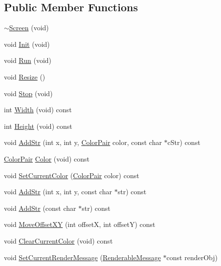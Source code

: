 \subsection*{Public Member Functions}
\begin{DoxyCompactItemize}
\item 
\hyperlink{classScreen_aca8e6d405d54bd0ea318564f11a68f00}{$\sim$\-Screen} (void)
\item 
void \hyperlink{classScreen_a383837c8034bc40ce87e96898d5be0cc}{Init} (void)
\item 
void \hyperlink{classScreen_a48842cd1df5d4117dee21a028da74a40}{Run} (void)
\item 
void \hyperlink{classScreen_a69154a73511bc8620803fa8f646ddd86}{Resize} ()
\item 
void \hyperlink{classScreen_aadce9111b1acb69bd0e6f788ae2bbd1b}{Stop} (void)
\item 
int \hyperlink{classScreen_a40b0a6eabbfe785a379388064ccea5c3}{Width} (void) const 
\item 
int \hyperlink{classScreen_abb048c10e10b8c375e64d52137a9d279}{Height} (void) const 
\item 
void \hyperlink{classScreen_a1274f1b8ed227c757d390cd764fb16d0}{Add\-Str} (int x, int y, \hyperlink{classScreen_ade5d330a53244ab5e204c9fc2a8ab235}{Color\-Pair} color, const char $\ast$c\-Str) const 
\item 
\hyperlink{classScreen_ade5d330a53244ab5e204c9fc2a8ab235}{Color\-Pair} \hyperlink{classScreen_a09e8fb5148385cb5b9f9b0402617ae80}{Color} (void) const 
\item 
void \hyperlink{classScreen_a1237833b525a279bccec474488f49220}{Set\-Current\-Color} (\hyperlink{classScreen_ade5d330a53244ab5e204c9fc2a8ab235}{Color\-Pair} color) const 
\item 
void \hyperlink{classScreen_a2195b9634c45b2d3158c7b6f749b910c}{Add\-Str} (int x, int y, const char $\ast$str) const 
\item 
void \hyperlink{classScreen_aa2940a795d5a7b2ef7ce7321bb8e31e3}{Add\-Str} (const char $\ast$str) const 
\item 
void \hyperlink{classScreen_aee7ca5e081d29f87a75d83932bace80f}{Move\-Offset\-X\-Y} (int offset\-X, int offset\-Y) const 
\item 
void \hyperlink{classScreen_a93d9bd83f95acec95ab695cfa8ed7230}{Clear\-Current\-Color} (void) const 
\item 
void \hyperlink{classScreen_ade6282ee71fe718c5a46c96578a7e00e}{Set\-Current\-Render\-Message} (\hyperlink{classRenderableMessage}{Renderable\-Message} $\ast$const render\-Obj)
\end{DoxyCompactItemize}
